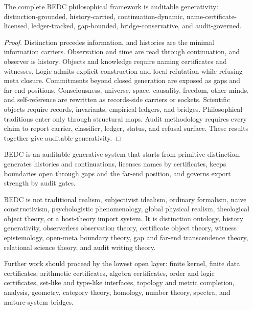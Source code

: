 \begin{theorem}
\label{thm:philosophy-auditable-generativity-total}
The complete BEDC philosophical framework is auditable generativity:
distinction-grounded, history-carried, continuation-dynamic,
name-certificate-licensed, ledger-tracked, gap-bounded,
bridge-conservative, and audit-governed.
\end{theorem}
\begin{proof}
Distinction precedes information, and histories are the minimal
information carriers. Observation and time are read through
continuation, and observer is history. Objects and knowledge require
naming certificates and witnesses. Logic admits explicit construction
and local refutation while refusing meta closure. Commitments beyond
closed generation are exposed as gaps and far-end positions.
Consciousness, universe, space, causality, freedom, other minds, and
self-reference are rewritten as records-side carriers or sockets.
Scientific objects require records, invariants, empirical ledgers, and
bridges. Philosophical traditions enter only through structural maps.
Audit methodology requires every claim to report carrier, classifier,
ledger, status, and refusal surface. These results together give
auditable generativity.
\end{proof}

\begin{corollary}
\label{cor:philosophy-one-sentence-characterization}
BEDC is an auditable generative system that starts from primitive
distinction, generates histories and continuations, licenses names by
certificates, keeps boundaries open through gaps and the far-end
position, and governs export strength by audit gates.
\end{corollary}

\begin{corollary}
\label{cor:philosophy-negative-characterization-total}
BEDC is not traditional realism, subjectivist idealism, ordinary
formalism, naive constructivism, psychologistic phenomenology, global
physical realism, theological object theory, or a host-theory import
system. It is distinction ontology, history generativity, observerless
observation theory, certificate object theory, witness epistemology,
open-meta boundary theory, gap and far-end transcendence theory,
relational science theory, and audit writing theory.
\end{corollary}

\begin{corollary}
\label{cor:philosophy-research-programme-total}
Further work should proceed by the lowest open layer: finite kernel,
finite data certificates, arithmetic certificates, algebra
certificates, order and logic certificates, set-like and type-like
interfaces, topology and metric completion, analysis, geometry,
category theory, homology, number theory, spectra, and mature-system
bridges.
\end{corollary}

